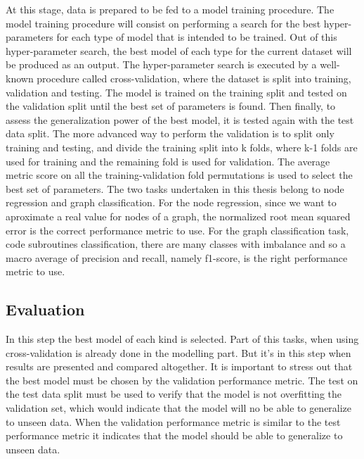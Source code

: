 At this stage, data is prepared to be fed to a model training procedure. The model training procedure will consist on performing a search for the best hyper-parameters for each type of model that is intended to be trained. Out of this hyper-parameter search, the best model of each type for the current dataset will be produced as an output. 
The hyper-parameter search is executed by a well-known procedure called cross-validation, where the dataset is split into training, validation and testing. The model is trained on the training split and tested on the validation split until the best set of parameters is found. Then finally, to assess the generalization power of the best model, it is tested again with the test data split. 
The more advanced way to perform the validation is to split only training and testing, and divide the training split into k folds, where k-1 folds are used for training and the remaining fold is used for validation. The average metric score on all the training-validation fold permutations is used to select the best set of parameters.
The two tasks undertaken in this thesis belong to node regression and graph classification. For the node regression, since we want to aproximate a real value for nodes of a graph, the normalized root mean squared error is the correct performance metric to use. For the graph classification task, code subroutines classification, there are many classes with imbalance and so a macro average of precision and recall, namely f1-score, is the right performance metric to use.

\subsection{Evaluation}

In this step the best model of each kind is selected. Part of this tasks, when using cross-validation is already done in the modelling part. But it's in this step when results are presented and compared altogether. 
It is important to stress out that the best model must be chosen by the validation performance metric. The test on the test data split must be used to verify that the model is not overfitting the validation set, which would indicate that the model will no be able to generalize to unseen data. When the validation performance metric is similar to the test performance metric it indicates that the model should be able to generalize to unseen data.


